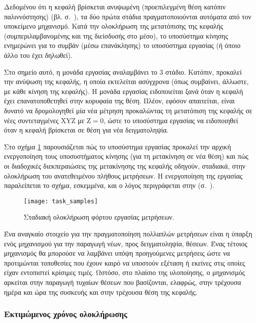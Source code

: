 Δεδομένου ότι η κεφαλή βρίσκεται ανυψωμένη (προεπιλεγμένη θέση κατόπιν
παλιννόστησης) (βλ. σ.~\pageref{subsec:motor:homing}),
τα δύο πρώτα στάδια πραγματοποιούνται αυτόματα από τον
υποκείμενο μηχανισμό. Κατά την ολοκλήρωση της μετατόπισης της κεφαλής
(συμπεριλαμβανομένης και της διείσδυσής στο μέσο), το υποσύστημα κίνησης
ενημερώνει για το συμβάν (μέσω επανάκλησης) το υποσύστημα εργασίας (ή όποιο άλλο
του έχει δηλωθεί).

Στο σημείο αυτό, η μονάδα εργασίας αναλαμβάνει το 3 στάδιο. Κατόπιν,
προκαλεί την ανύψωση της κεφαλής, η οποία εκτελείται ασύγχρονα (όπως συμβαίνει,
άλλωστε, με κάθε κίνηση της κεφαλής). Η μονάδα εργασίας ειδοποιείται ξανά
όταν η κεφαλή έχει επανατοποθετηθεί στην κορυφαία της θέση. Πλέον, εφόσον
απαιτείται, είναι δυνατό να δρομολογηθεί μία νέα μέτρηση προκαλώντας τη
μετατόπιση της κεφαλής σε νέες συντεταγμένες XYZ με $\text{Z} = 0$, ώστε το
υποσύστημα εργασίας να ειδοποιηθεί όταν η κεφαλή βρίσκεται σε θέση για νέα
δειγματοληψία.

Στο σχήμα \ref{fig:task:samples} παρουσιάζεται πώς το υποσύστημα εργασίας
προκαλεί την αρχική ενεργοποίηση τους υποσυστήματος κίνησης (για τη μετακίνηση
σε νέα θέση) και πώς οι διαδοχικές διεκπεραιώσεις της μετακίνησης της κεφαλής
οδηγούν, σταδιακά, στην ολοκλήρωση του ανατεθειμένου πλήθους μετρήσεων. Η
ενεργοποίηση της εργασίας παραλείπεται το σχήμα, εσκεμμένα, και ο λόγος
περιγράφεται στην 
(σ.~\pageref{ssubsec:task:initiate}).

\begin{figure}
    \caption{Σταδιακή ολοκλήρωση φόρτου εργασίας μετρήσεων.
    \label{fig:task:samples}}
    \begin{center}
    \texttt{[image: task\_samples]}
    \end{center}
\end{figure}

Ένα αναγκαίο στοιχείο για την πραγματοποίηση πολλαπλών μετρήσεων είναι η ύπαρξη
ενός μηχανισμού για την παραγωγή νέων, προς δειγματοληψία, θέσεων. Ένας τέτοιος
μηχανισμός θα μπορούσε να λαμβάνει υπόψη προηγούμενες μετρήσεις ώστε να
προτιμώνται τοποθεσίες που έχουν καιρό να υποστούν εξέταση ή εκείνες στις οποίες
είχαν εντοπιστεί κρίσιμες τιμές. Ωστόσο, στο πλαίσιο της υλοποίησης, ο
μηχανισμός αρκείται στην παραγωγή τυχαίων θέσεων που βασίζονται, ελαφρώς, στην
τρέχουσα ημέρα και ώρα της συσκευής
και στην τρέχουσα θέση της κεφαλής.


\subsubsection{Εκτιμώμενος χρόνος ολοκλήρωσης}


